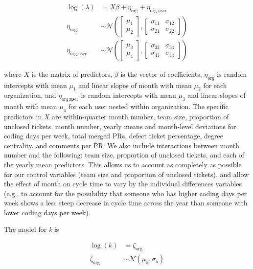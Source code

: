 \documentclass[manuscript,screen,review]{acmart}
\begin{document}
\begin{equation}
\begin{aligned}
\log(\lambda) &= X\beta + \eta_{\text{org}} + \eta_{\text{org:user}} \\
\eta_{\text{org}} &\sim \mathcal{N}\left(\begin{bmatrix} \mu_1 \\ \mu_2 \end{bmatrix}, \begin{bmatrix} \sigma_{11} & \sigma_{12} \\ \sigma_{21} & \sigma_{22} \end{bmatrix}\right) \\
\eta_{\text{org:user}} &\sim \mathcal{N}\left(\begin{bmatrix} \mu_3 \\ \mu_4 \end{bmatrix}, \begin{bmatrix} \sigma_{33} & \sigma_{34} \\ \sigma_{43} & \sigma_{44} \end{bmatrix}\right) 
\end{aligned}
\end{equation}

where \(X\) is the matrix of predictors, \(\beta\) is the vector of
coefficients, \(\eta_{\text{org}}\) is random intercepts with mean
\(\mu_1\) and linear slopes of month with mean \(\mu_2\) for each
organization, and \(\eta_{\text{org:user}}\) is random intercepts with
mean \(\mu_3\) and linear slopes of month with mean \(\mu_4\) for each
user nested within organization. The specific predictors in \(X\) are
within-quarter month number, team size, proportion of unclosed tickets,
month number, yearly means and month-level deviations for coding days
per week, total merged PRs, defect ticket percentage, degree centrality,
and comments per PR. We also include interactions between month number
and the following: team size, proportion of unclosed tickets, and each
of the yearly mean predictors. This allows us to account as completely
as possible for our control variables (team size and proportion of
unclosed tickets), and allow the effect of month on cycle time to vary
by the individual differences variables (e.g., to account for the
possibility that someone who has higher coding days per week shows a
less steep decrease in cycle time across the year than someone with
lower coding days per week).

The model for \emph{k} is

\begin{equation}
\begin{aligned}
\log(k) &= \zeta_{\text{org}} \\
\zeta_{\text{org}} &\sim \mathcal{N}(\mu_5, \sigma_{5}) 
\end{aligned}
\end{equation}
\end{document}
